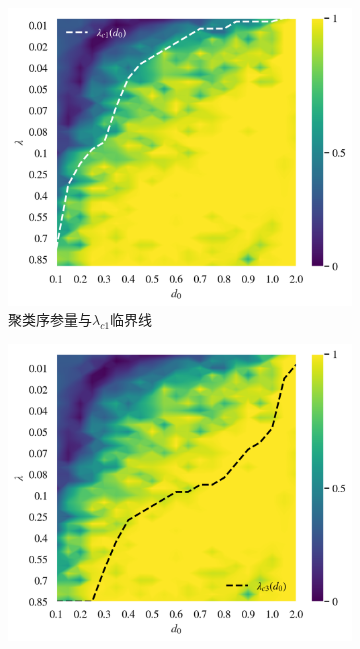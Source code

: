 \documentclass{article}
\begin{document}
\begin{figure}[H]
	\centering
	\begin{subfigure}[b]{0.49\textwidth}
		\includegraphics[width=\textwidth]{./figs/circleSwarmEdgesSync.png}
		\vspace{-1cm}
		\caption{聚类序参量与$\lambda_{c1}$临界线}
	\end{subfigure}
	\begin{subfigure}[b]{0.49\textwidth}
		\includegraphics[width=\textwidth]{./figs/circleSwarmEdgesTotalSync.png}

\end{subfigure}
\end{figure}
\end{document}
